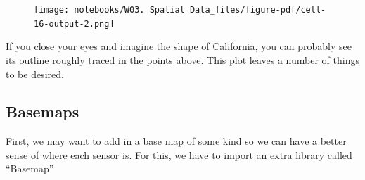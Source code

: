 \documentclass[
  letterpaper,
  DIV=11,
  numbers=noendperiod]{scrreprt}
\begin{document}
\begin{figure}[H]

{\centering \texttt{[image: notebooks/W03. Spatial Data\_files/figure-pdf/cell-16-output-2.png]}

}

\end{figure}

If you close your eyes and imagine the shape of California, you can
probably see its outline roughly traced in the points above. This plot
leaves a number of things to be desired.

\hypertarget{basemaps}{%
\subsection{Basemaps}\label{basemaps}}

First, we may want to add in a base map of some kind so we can have a
better sense of where each sensor is. For this, we have to import an
extra library called ``Basemap''
\end{document}
